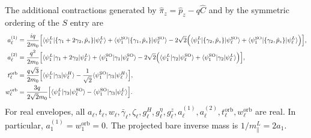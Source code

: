 \documentclass[10pt,letterpaper]{article}
\newcommand{\mel}[3]{\langle #1\vert #2\vert #3\rangle}
\newcommand{\SO}{\mathrm{SO}}
\begin{document}
The additional contractions generated by $\hat\pi_z=\hat p_z-q\hat C$
and by the symmetric ordering of the $S$ entry are
\begin{align}
 a_\ell^{(1)}={}&\frac{iq}{2m_0}\Bigl[
 \mel{\psi_1^L}{\{\gamma_1+2\gamma_2,\hat p_z\}}{\psi_\ell^L}
 +\mel{\psi_1^{\SO}}{\{\gamma_1,\hat p_z\}}{\psi_\ell^{\SO}}
 -2\sqrt2\Bigl(
 \mel{\psi_1^L}{\{\gamma_2,\hat p_z\}}{\psi_\ell^{\SO}}
 +\mel{\psi_1^{\SO}}{\{\gamma_2,\hat p_z\}}{\psi_\ell^L}
 \Bigr)\Bigr],\label{eq:swt6-a1orb}\\
 a_\ell^{(2)}={}&\frac{q^2}{2m_0}\Bigl[
 \mel{\psi_1^L}{\gamma_1+2\gamma_2}{\psi_\ell^L}
 +\mel{\psi_1^{\SO}}{\gamma_1}{\psi_\ell^{\SO}}
 -2\sqrt2\Bigl(
 \mel{\psi_1^L}{\gamma_2}{\psi_\ell^{\SO}}
 +\mel{\psi_1^{\SO}}{\gamma_2}{\psi_\ell^L}
 \Bigr)\Bigr],\label{eq:swt6-a2orb}\\
 t_\ell^{\mathrm{orb}}={}&\frac{q\sqrt3}{2m_0}\Bigl[
 \mel{\psi_1^L}{\gamma_3}{\psi_\ell^H}
 -\frac1{\sqrt2}\mel{\psi_1^{\SO}}{\gamma_3}{\psi_\ell^H}
 \Bigr],\label{eq:swt6-torb}\\
 w_\ell^{\mathrm{orb}}={}&\frac{3q}{2\sqrt2m_0}\Bigl[
 \mel{\psi_1^L}{\gamma_3}{\psi_\ell^{\SO}}
 -\mel{\psi_1^{\SO}}{\gamma_3}{\psi_\ell^L}
 \Bigr].\label{eq:swt6-worb}
\end{align}
For real envelopes, all $a_\ell,t_\ell,w_\ell,\bar\gamma_\ell,
\zeta_\ell,g_\ell^H,g_\ell^\eta,g_\ell^z,a_\ell^{(1)},
a_\ell^{(2)},t_\ell^{\mathrm{orb}},w_\ell^{\mathrm{orb}}$ are real.
In particular, $a_1^{(1)}=w_1^{\mathrm{orb}}=0$.
The projected bare inverse mass is $1/m_\parallel^L=2a_1$.
\end{document}
